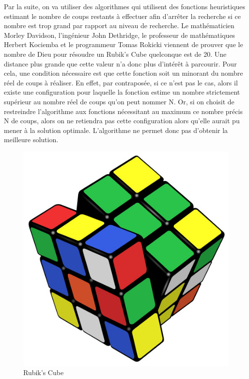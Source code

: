\documentclass[fleqn,10pt,french]{SelfArx} %
\begin{document}
Par la suite, on va utiliser des algorithmes qui utilisent des fonctions heuristiques estimant le nombre de coups restants à effectuer afin d'arrêter la recherche si ce nombre est trop grand par rapport au niveau de recherche. Le mathématicien Morley Davidson, l’ingénieur John Dethridge, le professeur de mathématiques Herbert Kociemba et le programmeur Tomas Rokicki viennent de prouver que le nombre de Dieu pour résoudre un Rubik’s Cube quelconque est de 20. Une distance plus grande que cette valeur n’a donc plus d’intérêt à parcourir. Pour cela, une condition nécessaire est que cette fonction soit un minorant du nombre réel de coups à réaliser. En effet, par contraposée, si ce n'est pas le cas, alors il existe une configuration pour laquelle la fonction estime un nombre strictement supérieur au nombre réel de coups qu'on peut nommer N. Or, si on choisit de restreindre l'algorithme aux fonctions nécessitant au maximum ce nombre précis N de coups, alors on ne retiendra pas cette configuration alors qu'elle aurait pu mener à la solution optimale. L'algorithme ne permet donc pas d'obtenir la meilleure solution.

\begin{figure}[h]
\centering 
\includegraphics[scale = 0.3]{RubikCube.jpg}
\caption{Rubik’s Cube}
\end{figure}
\end{document}
